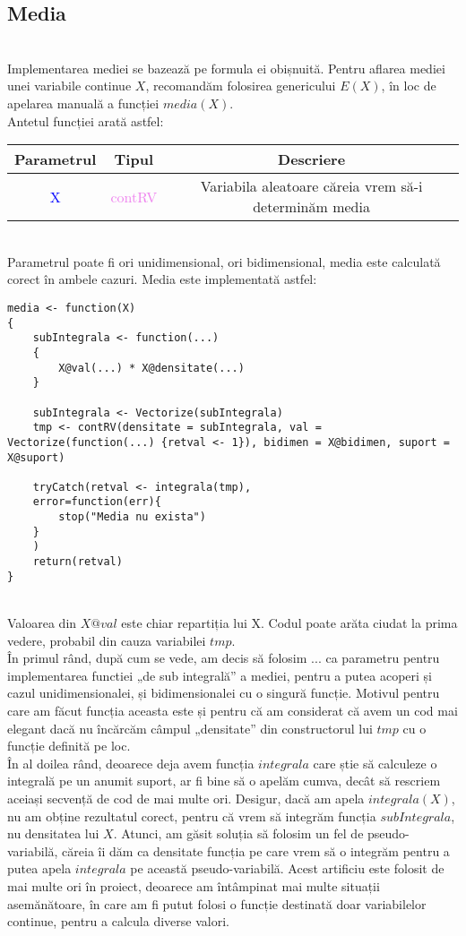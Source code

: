 \documentclass[12pt]{article}
\begin{document}
\subsection{Media} \hfill \\
\indent Implementarea mediei se bazează pe formula ei obișnuită. Pentru aflarea mediei unei variabile continue $X$, recomandăm folosirea genericului $E(X)$, în loc de apelarea manuală a funcției $media(X)$.\\
\indent Antetul funcției arată astfel:
\begin{center}
	\begin{tabular}{|| c | c | c ||}
		\hline
		Parametrul & Tipul & Descriere \\
		\hline
		\textcolor{blue}{X} & \textcolor{violet}{contRV} & Variabila aleatoare căreia vrem să-i determinăm media\\
		\hline
	\end{tabular}
\end{center}\hfill \\
\indent Parametrul poate fi ori unidimensional, ori bidimensional, media este calculată corect în ambele cazuri. Media este implementată astfel: 
\begin{lstlisting}
media <- function(X)
{
	subIntegrala <- function(...)
	{
		X@val(...) * X@densitate(...)
	}
	
	subIntegrala <- Vectorize(subIntegrala)
	tmp <- contRV(densitate = subIntegrala, val = Vectorize(function(...) {retval <- 1}), bidimen = X@bidimen, suport = X@suport)
	
	tryCatch(retval <- integrala(tmp),
	error=function(err){
		stop("Media nu exista")
	}
	)
	return(retval)
}
\end{lstlisting} \hfill \\
\indent Valoarea din $X@val$ este chiar repartiția lui X. Codul poate arăta ciudat la prima vedere, probabil din cauza variabilei $tmp$.\\
\indent În primul rând, după cum se vede, am decis să folosim $...$ ca parametru pentru implementarea functiei „de sub integrală” a mediei, pentru a putea acoperi și cazul unidimensionalei, și bidimensionalei cu o singură funcție. Motivul pentru care am făcut funcția aceasta este și pentru că am considerat că avem un cod mai elegant dacă nu încărcăm câmpul „densitate” din constructorul lui $tmp$ cu o funcție definită pe loc.\\
\indent În al doilea rând, deoarece deja avem funcția $integrala$ care știe să calculeze o integrală pe un anumit suport, ar fi bine să o apelăm cumva, decât să rescriem aceiași secvență de cod de mai multe ori. Desigur, dacă am apela $integrala(X)$, nu am obține rezultatul corect, pentru că vrem să integrăm funcția $subIntegrala$, nu densitatea lui $X$. Atunci, am găsit soluția să folosim un fel de pseudo-variabilă, căreia îi dăm ca densitate funcția pe care vrem să o integrăm pentru a putea apela $integrala$ pe această pseudo-variabilă. Acest artificiu este folosit de mai multe ori în proiect, deoarece am întâmpinat mai multe situații asemănătoare, în care am fi putut folosi o funcție destinată doar variabilelor continue, pentru a calcula diverse valori.\\
\end{document}
